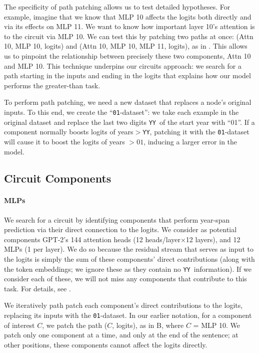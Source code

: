 \documentclass{article}
\newcommand{\YY}{\texttt{YY}}
\begin{document}
    The specificity of path patching allows us to test detailed hypotheses. For example, imagine that we know that MLP 10 affects the logits both directly and via its effects on MLP 11. We want to know how important layer 10's attention is to the circuit via MLP 10. We can test this by patching two paths at once: (Attn 10, MLP 10, logits) and (Attn 10, MLP 10, MLP 11, logits), as in . This allows us to pinpoint the relationship between precisely these two components, Attn 10 and MLP 10. This technique underpins our circuits approach: we search for a path starting in the inputs and ending in the logits that explains how our model performs the greater-than task.

    To perform path patching, we need a new dataset that replaces a node's original inputs. To this end, we create the ``\texttt{01}-dataset'': we take each example in the original dataset and replace the last two digits \YY\  of the start year with ``01''. If a component normally boosts logits of years$>$\YY, patching it with the \texttt{01}-dataset will cause it to boost the logits of years $>01$, inducing a larger error in the model. 

    \subsection{Circuit Components} \label{sec:circuit-finding}

	\paragraph{MLPs} We search for a circuit by identifying components that perform year-span prediction via their direct connection to the logits. We consider as potential components GPT-2's 144 attention heads (12 heads/layer$\times$12 layers), and 12 MLPs (1 per layer). We do so because the residual stream \citep{elhage2021mathematical} that serves as input to the logits is simply the sum of these components' direct contributions (along with the token embeddings; we ignore these as they contain no \YY\ information). If we consider each of these, we will not miss any components that contribute to this task. For details, see .
 
    We iteratively path patch each component's direct contributions to the logits, replacing its inputs with the \texttt{01}-dataset. In our earlier notation, for a component of interest $C$, we patch the path ($C$, logits), as in  B, where $C$ = MLP 10. We patch only one component at a time, and only at the end of the sentence; at other positions, these components cannot affect the logits directly.
 
\end{document}
